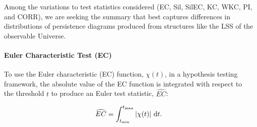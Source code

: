 \documentclass[12pt]{article}
\begin{document}



Among the variations to test statistics considered (EC, Sil, SilEC, KC, WKC, PI, and CORR), we are seeking the summary that best captures differences in distributions of persistence diagrams produced from structures like the LSS of the observable Universe.  

\paragraph{Euler Characteristic Test (EC)}
To use the Euler characteristic (EC) function, $\chi(t)$, in a hypothesis testing framework, the absolute value of the EC function is integrated with respect to the threshold $t$ to produce an Euler test statistic, $\widehat{EC}$:

\begin{equation*}
\widehat{EC} = \int_{t_{\min}}^{t_{\max}} | \chi(t) | \textup{ d}t.
\end{equation*}
\end{document}
